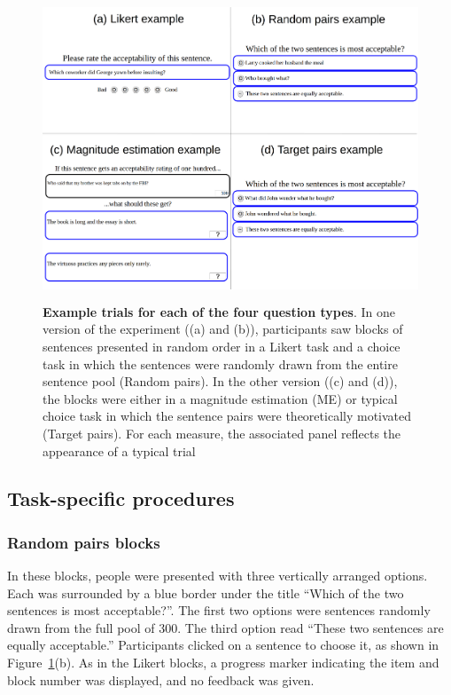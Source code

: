 \documentclass[doc]{apa6}
\newcommand{\targchoice}{{\sc Target pairs}}
\newcommand{\rndchoice}{{\sc Random pairs}}
\newcommand{\ME}{{\sc ME}}%
\newcommand{\likert}{{\sc Likert}}
\newcommand{\choicetask}{choice task}
\begin{document}
 \begin{figure}[t]
 \centering
 \includegraphics[height=9cm,keepaspectratio]{figures/exampletrials.png}
 \caption{{\small {\bf Example trials for each of the four question types}. In one version of the experiment ((a) and (b)), participants saw blocks of sentences presented in random order in a \likert{} task and a \choicetask{ }in which the sentences were randomly drawn from the entire sentence pool (\rndchoice). In the other version ((c) and (d)), the blocks were either in a magnitude estimation (\ME) or typical \choicetask{ }in which the sentence pairs were theoretically motivated (\targchoice). For each measure, the associated panel reflects the appearance of a typical trial}}
\label{exampletrials}
\end{figure}

\subsection{Task-specific procedures}


\subsubsection{Random pairs blocks} In these blocks, people were presented with three vertically arranged options. Each was surrounded by a blue border under the title ``Which of the two sentences is most acceptable?''. The first two options were sentences randomly drawn from the full pool of 300. %
The third option read ``These two sentences are equally acceptable.'' Participants clicked on a sentence to choose it, as shown in Figure~\ref{exampletrials}(b). As in the \likert{} blocks, a progress marker indicating the item and block number was displayed, and no feedback was given.
\end{document}
